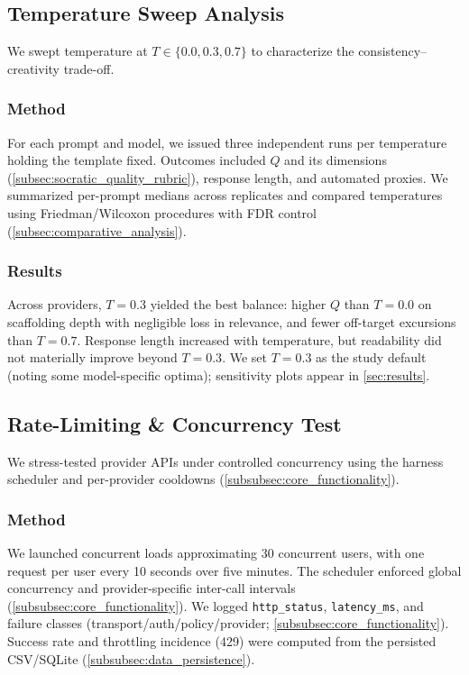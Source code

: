 \subsection{Temperature Sweep Analysis}\label{subsec:temperature_sweep}

We swept temperature at $T\in\{0.0, 0.3, 0.7\}$ to characterize the consistency–creativity trade-off.

\subsubsection{Method}\label{subsubsec:temperature_method}

For each prompt and model, we issued three independent runs per temperature holding the template fixed. Outcomes included $Q$ and its dimensions (\cref{subsec:socratic_quality_rubric}), response length, and automated proxies. We summarized per-prompt medians across replicates and compared temperatures using Friedman/Wilcoxon procedures with FDR control (\cref{subsec:comparative_analysis}).

\subsubsection{Results}\label{subsubsec:temperature_results}

Across providers, $T=0.3$ yielded the best balance: higher $Q$ than $T=0.0$ on scaffolding depth with negligible loss in relevance, and fewer off-target excursions than $T=0.7$. Response length increased with temperature, but readability did not materially improve beyond $T=0.3$. We set $T=0.3$ as the study default (noting some model-specific optima); sensitivity plots appear in \cref{sec:results}.

\subsection{Rate-Limiting \& Concurrency Test}\label{subsec:rate_limiting}

We stress-tested provider APIs under controlled concurrency using the harness scheduler and per-provider cooldowns (\cref{subsubsec:core_functionality}).

\subsubsection{Method}\label{subsubsec:rate_limiting_method}

We launched concurrent loads approximating 30 concurrent users, with one request per user every 10 seconds over five minutes. The scheduler enforced global concurrency and provider-specific inter-call intervals (\cref{subsubsec:core_functionality}). We logged \verb|http_status|, \verb|latency_ms|, and failure classes (transport/auth/policy/provider; \cref{subsubsec:core_functionality}). Success rate and throttling incidence (429) were computed from the persisted CSV/SQLite (\cref{subsubsec:data_persistence}).

